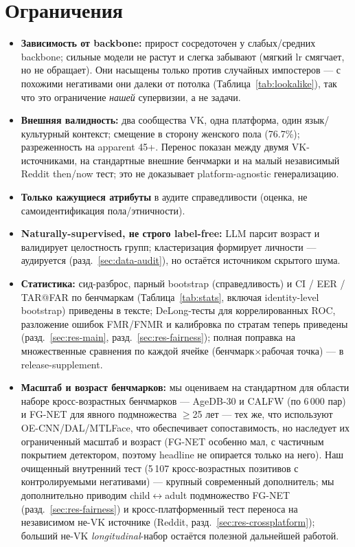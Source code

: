 \documentclass[journal]{IEEEtran}
\begin{document}
\section{Ограничения}\label{sec:limitations}
\begin{itemize}[leftmargin=1.2em]
\item \textbf{Зависимость от backbone:} прирост сосредоточен у слабых/средних backbone; сильные модели не растут и слегка забывают (мягкий lr смягчает, но не обращает). Они насыщены только против случайных импостеров --- с похожими негативами они далеки от потолка (Таблица~\ref{tab:lookalike}), так что это ограничение \emph{нашей} супервизии, а не задачи.
\item \textbf{Внешняя валидность:} два сообщества VK, одна платформа, один язык/культурный контекст; смещение в сторону женского пола (76.7\%); разреженность на apparent 45+. Перенос показан между двумя VK-источниками, на стандартные внешние бенчмарки и на малый независимый Reddit then/now тест; это не доказывает platform-agnostic генерализацию.
\item \textbf{Только кажущиеся атрибуты} в аудите справедливости (оценка, не самоидентификация пола/этничности).
\item \textbf{Naturally-supervised, не строго label-free:} LLM парсит возраст и валидирует целостность групп; кластеризация формирует личности --- аудируется (разд.~\ref{sec:data-audit}), но остаётся источником скрытого шума.
\item \textbf{Статистика:} сид-разброс, парный bootstrap (справедливость) и CI / EER / TAR@FAR по бенчмаркам (Таблица~\ref{tab:stats}, включая identity-level bootstrap) приведены в тексте; DeLong-тесты для коррелированных ROC, разложение ошибок FMR/FNMR и калибровка по стратам теперь приведены (разд.~\ref{sec:res-main}, разд.~\ref{sec:res-fairness}); полная поправка на множественные сравнения по каждой ячейке (бенчмарк$\times$рабочая точка) --- в release-supplement.
\item \textbf{Масштаб и возраст бенчмарков:} мы оцениваем на стандартном для области наборе кросс-возрастных бенчмарков --- AgeDB-30 и CALFW (по 6\,000 пар) и FG-NET для явного подмножества $\geq$25 лет --- тех же, что используют OE-CNN/DAL/MTLFace, что обеспечивает сопоставимость, но наследует их ограниченный масштаб и возраст (FG-NET особенно мал, с частичным покрытием детектором, поэтому headline не опирается только на него). Наш очищенный внутренний тест (5\,107 кросс-возрастных позитивов с контролируемыми негативами) --- крупный современный дополнитель; мы дополнительно приводим child$\leftrightarrow$adult подмножество FG-NET (разд.~\ref{sec:res-fairness}) и кросс-платформенный тест переноса на независимом не-VK источнике (Reddit, разд.~\ref{sec:res-crossplatform}); больший не-VK \emph{longitudinal}-набор остаётся полезной дальнейшей работой.

\end{itemize}
\end{document}
